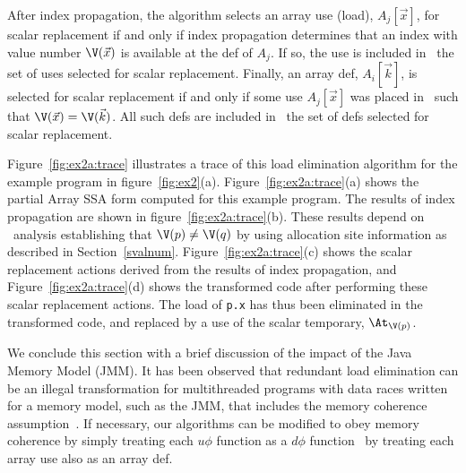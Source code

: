 
After index propagation, the algorithm selects an array use (load),
$A_j[\vec{x}]$, for scalar replacement if and only if index propagation
determines that an index with value number $\V(\vec{x})$ is available at the 
def of $A_j$.
If so, the use is included in  \URS\, the set of uses selected
for scalar replacement.
Finally, an array def, $A_i[\vec{k}]$, is selected for
scalar replacement if and only if some use $A_j[\vec{x}]$ was placed in \URS\ such
that  $\V(\vec{x})=\V(\vec{k})$.  
All such defs are included in \DRS\, the set of defs selected for scalar
replacement.



Figure~\ref{fig:ex2a:trace} illustrates a trace of this load
elimination algorithm for the example program in
figure~\ref{fig:ex2}(a).  Figure~\ref{fig:ex2a:trace}(a) shows the
partial Array SSA form computed for this example program.  The results
of index propagation are shown in figure~\ref{fig:ex2a:trace}(b).
These results depend on \dd\ analysis establishing that $\V(p) \not=
\V(q)$ by using allocation site information as described in
Section~\ref{svalnum}.
Figure~\ref{fig:ex2a:trace}(c) shows the scalar replacement actions
derived from the results of index propagation, and
Figure~\ref{fig:ex2a:trace}(d) shows the transformed code after
performing these scalar replacement actions.  The load of {\tt p.x}
has thus
been eliminated in the transformed code, and replaced by a use
of the scalar temporary, $\At_{\V(p)}$.

We conclude this section with a brief discussion of the impact of
the Java Memory Model (JMM).
It has been observed that redundant load elimination
can be an illegal
transformation for multithreaded programs with data races written for a
memory model, such as the JMM,
that includes the memory coherence
assumption~\cite{pugh99}. 
If necessary, our algorithms can be modified to 
obey memory coherence by simply treating each $u\phi$ function 
as a $d\phi$ function \ie\ by treating each array use also as an array def.
